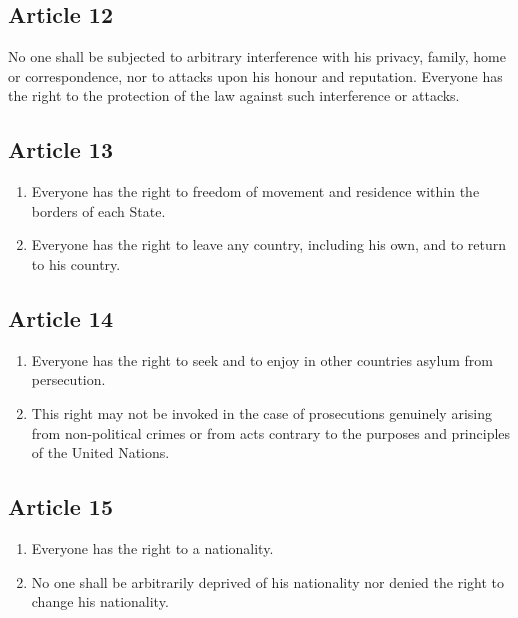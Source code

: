 \documentclass[
  ngerman,
  american,
  titlepage,
  openright,
  DIV=calc,
  toc=listof,
  listof=nochaptergap]{scrbook}
\begin{document}
\subsection{Article 12}\label{article-12-4}

No one shall be subjected to arbitrary interference with his privacy,
family, home or correspondence, nor to attacks upon his honour and
reputation. Everyone has the right to the protection of the law against
such interference or attacks.

\subsection{Article 13}\label{article-13-4}

\begin{enumerate}
\def\labelenumi{\arabic{enumi}.}
\item
  Everyone has the right to freedom of movement and residence within the
  borders of each State.
\item
  Everyone has the right to leave any country, including his own, and to
  return to his country.
\end{enumerate}

\subsection{Article 14}\label{article-14-4}

\begin{enumerate}
\def\labelenumi{\arabic{enumi}.}
\item
  Everyone has the right to seek and to enjoy in other countries asylum
  from persecution.
\item
  This right may not be invoked in the case of prosecutions genuinely
  arising from non-political crimes or from acts contrary to the
  purposes and principles of the United Nations.
\end{enumerate}

\subsection{Article 15}\label{article-15-4}

\begin{enumerate}
\def\labelenumi{\arabic{enumi}.}
\item
  Everyone has the right to a nationality.
\item
  No one shall be arbitrarily deprived of his nationality nor denied the
  right to change his nationality.
\end{enumerate}
\end{document}

